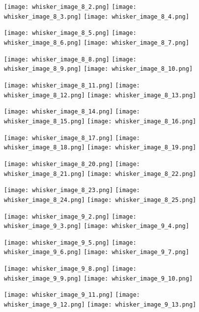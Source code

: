 \documentclass[12pt]{article}
\begin{document}
\begin{figure}
	\centerline{
		\texttt{[image: whisker\_image\_8\_2.png]}
		\texttt{[image: whisker\_image\_8\_3.png]}
		\texttt{[image: whisker\_image\_8\_4.png]}
	}
	\centerline{
		\texttt{[image: whisker\_image\_8\_5.png]}
		\texttt{[image: whisker\_image\_8\_6.png]}
		\texttt{[image: whisker\_image\_8\_7.png]}
	}
	\centerline{
		\texttt{[image: whisker\_image\_8\_8.png]}
		\texttt{[image: whisker\_image\_8\_9.png]}
		\texttt{[image: whisker\_image\_8\_10.png]}
	}
	\centerline{
		\texttt{[image: whisker\_image\_8\_11.png]}
		\texttt{[image: whisker\_image\_8\_12.png]}
		\texttt{[image: whisker\_image\_8\_13.png]}
	}
\end{figure}

\begin{figure}
	\centerline{
		\texttt{[image: whisker\_image\_8\_14.png]}
		\texttt{[image: whisker\_image\_8\_15.png]}
		\texttt{[image: whisker\_image\_8\_16.png]}
	}
	\centerline{
		\texttt{[image: whisker\_image\_8\_17.png]}
		\texttt{[image: whisker\_image\_8\_18.png]}
		\texttt{[image: whisker\_image\_8\_19.png]}
	}
	\centerline{
		\texttt{[image: whisker\_image\_8\_20.png]}
		\texttt{[image: whisker\_image\_8\_21.png]}
		\texttt{[image: whisker\_image\_8\_22.png]}
	}
	\centerline{
		\texttt{[image: whisker\_image\_8\_23.png]}
		\texttt{[image: whisker\_image\_8\_24.png]}
		\texttt{[image: whisker\_image\_8\_25.png]}
	}
\end{figure}

\begin{figure}
	\centerline{
		\texttt{[image: whisker\_image\_9\_2.png]}
		\texttt{[image: whisker\_image\_9\_3.png]}
		\texttt{[image: whisker\_image\_9\_4.png]}
	}
	\centerline{
		\texttt{[image: whisker\_image\_9\_5.png]}
		\texttt{[image: whisker\_image\_9\_6.png]}
		\texttt{[image: whisker\_image\_9\_7.png]}
	}
	\centerline{
		\texttt{[image: whisker\_image\_9\_8.png]}
		\texttt{[image: whisker\_image\_9\_9.png]}
		\texttt{[image: whisker\_image\_9\_10.png]}
	}
	\centerline{
		\texttt{[image: whisker\_image\_9\_11.png]}
		\texttt{[image: whisker\_image\_9\_12.png]}
		\texttt{[image: whisker\_image\_9\_13.png]}
	}
\end{figure}
\end{document}
